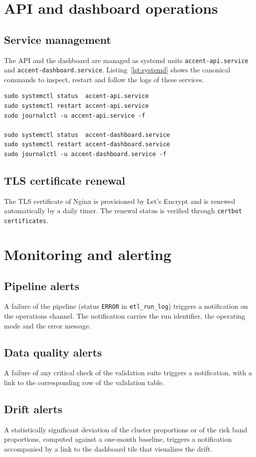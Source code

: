 \section{API and dashboard operations}

\subsection{Service management}
The API and the dashboard are managed as systemd units \texttt{accent-api.service} and \texttt{accent-dashboard.service}. Listing~\ref{lst:systemd} shows the canonical commands to inspect, restart and follow the logs of these services.

\begin{lstlisting}[style=bash,caption={Managing the API and dashboard systemd units.},label={lst:systemd}]
sudo systemctl status  accent-api.service
sudo systemctl restart accent-api.service
sudo journalctl -u accent-api.service -f

sudo systemctl status  accent-dashboard.service
sudo systemctl restart accent-dashboard.service
sudo journalctl -u accent-dashboard.service -f
\end{lstlisting}

\subsection{TLS certificate renewal}
The TLS certificate of Nginx is provisioned by Let's Encrypt and is renewed automatically by a daily timer. The renewal status is verified through \texttt{certbot certificates}.

\section{Monitoring and alerting}

\subsection{Pipeline alerts}
A failure of the pipeline (status \texttt{ERROR} in \texttt{etl\_run\_log}) triggers a notification on the operations channel. The notification carries the run identifier, the operating mode and the error message.

\subsection{Data quality alerts}
A failure of any critical check of the validation suite triggers a notification, with a link to the corresponding row of the validation table.

\subsection{Drift alerts}
A statistically significant deviation of the cluster proportions or of the risk band proportions, computed against a one-month baseline, triggers a notification accompanied by a link to the dashboard tile that visualizes the drift.

\cleardoublepage
